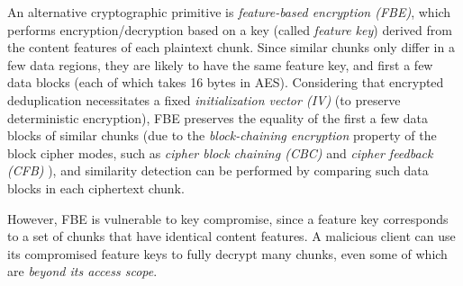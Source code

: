 An alternative cryptographic primitive is {\em feature-based encryption (FBE)}, which performs encryption/decryption based on a key (called {\em feature key}) derived from the content features of each plaintext chunk.
Since similar chunks only differ in a few data regions, they are likely to  have the same feature key, and first a few data blocks (each of which takes 16 bytes in AES). Considering that  encrypted deduplication \cite{douceur02, shah15} necessitates a fixed {\em initialization vector (IV)} (to preserve deterministic encryption), FBE preserves the equality of the first a few data blocks of similar chunks (due to the {\em block-chaining encryption} property of the block cipher modes, such as {\em cipher block chaining (CBC)} and {\em cipher feedback (CFB)} \cite{dworkin01}), and similarity detection can be performed by comparing such data blocks in each ciphertext chunk.





However, FBE is vulnerable to key compromise, since a feature key corresponds to a set of chunks that have identical content features. A malicious client can use its compromised feature keys to fully decrypt many chunks, even some of which are {\em beyond its access scope}.

